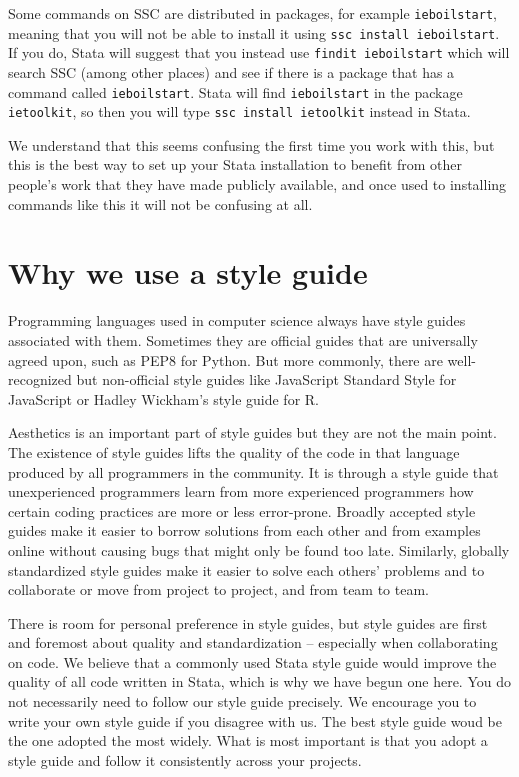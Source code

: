 Some commands on SSC are distributed in packages, for example \texttt{ieboilstart}, meaning that you will
not be able to install it using \verb+ssc install ieboilstart+. If you do, Stata will suggest that you
instead use \verb+findit ieboilstart+ which will search SSC (among other places) and see if there is a
package that has a command called \texttt{ieboilstart}. Stata will find \texttt{ieboilstart} in the package
\texttt{ietoolkit}, so then you will type \verb+ssc install ietoolkit+ instead in Stata.

We understand that this seems confusing the first time you work with this, but this is the best way to set
up your Stata installation to benefit from other people's work that they have made publicly available, and
once used to installing commands like this it will not be confusing at all.

\section{Why we use a style guide}

Programming languages used in computer science always have style guides associated with them. Sometimes
they are official guides that are universally agreed upon, such as PEP8 for
Python. But more commonly, there are well-recognized but
non-official style guides like JavaScript Standard Style for
JavaScript or Hadley Wickham's style guide for R.

Aesthetics is an important part of style guides but they are not the main point. The existence of style guides
lifts the quality of the code in that language produced by all programmers in the community.
It is through a style guide that unexperienced programmers learn from more experienced programmers
how certain coding practices are more or less error-prone. Broadly accepted style guides make it easier to
borrow solutions from each other and from examples online without causing bugs that might only be found too
late. Similarly, globally standardized style guides make it easier to solve each others'
problems and to collaborate or move from project to project, and from team to team.

There is room for personal preference in style guides, but style guides are first and foremost
about quality and standardization -- especially when collaborating on code. We believe that a commonly used Stata style guide
would improve the quality of all code written in Stata, which is why we have begun one here. You do not necessarily need to follow our
style guide precisely. We encourage you to write your own style guide if you disagree with us. The best style guide
woud be the one adopted the most widely. What is most important is that you adopt a style guide and follow it consistently across your projects.

